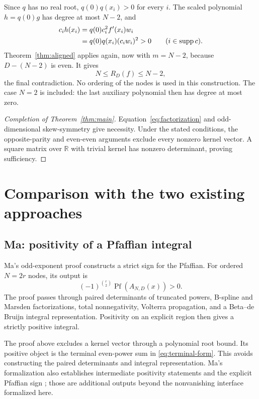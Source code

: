 \documentclass[11pt,a4paper]{article}
\numberwithin{equation}{section}
\theoremstyle{remark}
\newcommand{\R}{\mathbb R}
\newcommand{\supp}{\operatorname{supp}}
\newcommand{\Pf}{\operatorname{Pf}}
\begin{document}
Since $q$ has no real root, $q(0)q(x_i)>0$ for every $i$. The scaled
polynomial $h=q(0)g$ has degree at most $N-2$, and
\begin{align}\label{eq:new-alignment}
 c_ih(x_i)
 &=q(0)c_i^2f'(x_i)w_i\notag\\
 &=q(0)q(x_i)(c_iw_i)^2>0\qquad(i\in\supp c).
\end{align}
Theorem~\ref{thm:aligned} applies again, now with $m=N-2$, because
$D-(N-2)$ is even. It gives
\[
 N\le R_D(f)\le N-2,
\]
the final contradiction. No ordering of the nodes is used in this
construction. The case $N=2$ is included: the last auxiliary polynomial
then has degree at most zero.

\begin{proof}[Completion of Theorem~\ref{thm:main}]
Equation~\eqref{eq:factorization} and odd-dimensional skew-symmetry give
necessity. Under the stated conditions, the opposite-parity and even-even
arguments exclude every nonzero kernel vector. A square matrix over $\R$
with trivial kernel has nonzero determinant, proving sufficiency.
\end{proof}

\section{Comparison with the two existing approaches}

\subsection{Ma: positivity of a Pfaffian integral}

Ma's odd-exponent proof \cite{Ma} constructs a strict sign for the Pfaffian.
For ordered $N=2r$ nodes, its output is
\[
 (-1)^{\binom r2}\Pf(A_{N,D}(x))>0.
\]
The proof passes through paired determinants of truncated powers, B-spline
and Marsden factorizations, total nonnegativity, Volterra propagation, and a
Beta--de Bruijn integral representation. Positivity on an explicit region
then gives a strictly positive integral.

The proof above excludes a kernel vector through a polynomial root bound.
Its positive object is the terminal even-power sum in
\eqref{eq:terminal-form}. This avoids constructing the paired determinants
and integral representation. Ma's formalization also establishes intermediate
positivity statements and the explicit Pfaffian sign \cite{MaCode}; those
are additional outputs beyond the nonvanishing interface formalized here.
\end{document}
